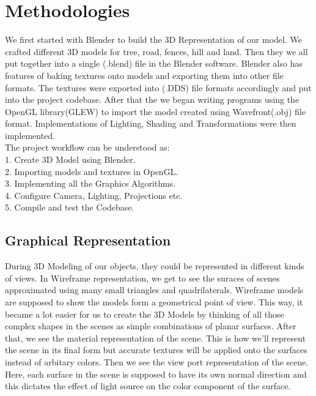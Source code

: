 \documentclass{report}
\begin{document}
\section{Methodologies}
    We first started with Blender to build the 3D Representation of our model. We crafted different 3D models 
    for tree, road, fences, hill and land. Then they we all put together into a single (.blend) file in the 
    Blender software. Blender also has features of baking textures onto models and exporting them into other 
    file formats. The textures were exported into (.DDS) file formats accordingly and put into the project 
    codebase. After that the we began writing programs using the OpenGL library(GLEW) to import the model created 
    using Wavefront(.obj) file format. Implementations of Lighting, Shading and Transformations were then implemented. 
    \\The project workflow can be understood as:
    \medskip
    \\1.    Create 3D Model using Blender. 
    \\2.    Importing models and textures in OpenGL. 
    \\3.    Implementing all the Graphics Algorithms. 
    \\4.    Configure Camera, Lighting, Projections etc. 
    \\5.    Compile and test the Codebase.
\subsection{Graphical Representation}
    During 3D Modeling of our objects, they could be represented in different kinds of views. In Wireframe 
    representation, we get to see the suraces of scenes approximated using many small triangles and quadrilaterals. 
    Wireframe models are supposed to show the models form a geometrical point of view. This way, it became a lot 
    easier for us to create the 3D Models by thinking of all those complex shapes in the scenes as simple combinations 
    of planar surfaces. After that, we see the material representation of the scene. This is how we'll represent the 
    scene in its final form but accurate textures will be applied onto the surfaces instead of arbitary colors. 
    Then we see the view port representation of the scene. Here, each surface in the scene is supposed to have its 
    own normal direction and this dictates the effect of light source on the color component of the surface.
\end{document}
